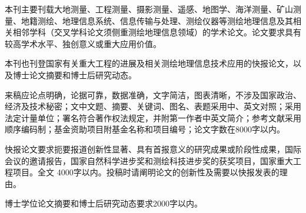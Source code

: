 
本刊主要刊载大地测量、工程测量、摄影测量、遥感、地图学、海洋测量、矿山测量、地籍测绘、地理信息系统、信息传输与处理、测绘仪器等测绘地理信息及其相关相邻学科（交叉学科论文须侧重测绘地理信息领域）的学术论文。论文要求具有较高学术水平、独创意义或重大应用价值。

本刊也刊登国家有关重大工程的进展及相关测绘地理信息技术应用的快报论文，以及博士论文摘要和博士后研究动态。

来稿应论点明确，论据可靠，数据准确，文字简洁，图表清晰，不涉及国家政治、经济及技术秘密；文中文题、摘要、关键词、图名、表题采用中、英文对照；采用法定计量单位；署名符合著作权法规定，并附第一作者中英文简介；参考文献采用顺序编码制；基金资助项目附基金名称和项目编号；论文字数在8000字以内。

快报论文要求扼要报道创新性显著、具有首报意义的研究成果或阶段性成果，国际会议的邀请报告，国家自然科学进步奖和测绘科技进步奖的获奖项目，国家重大工程项目。全文 4000字以内。投稿时请阐明论文的创新性及需要以快报发表的理由。

博士学位论文摘要和博士后研究动态要求2000字以内。